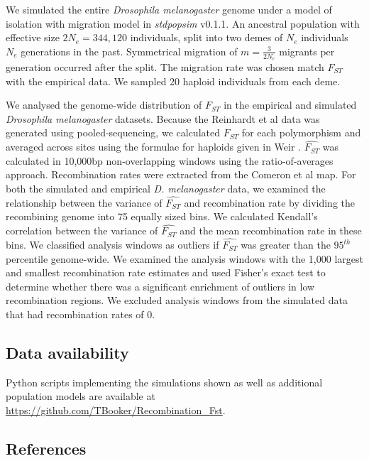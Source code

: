 \documentclass[9pt,twocolumn,twoside]{pnas-new}
\begin{document}
We simulated the entire \textit{Drosophila melanogaster} genome under a model of isolation with migration model in \textit{stdpopsim} v0.1.1. An ancestral population with effective size $2N_e = 344,120$ individuals, split into two demes of $N_e$ individuals $N_e$ generations in the past. Symmetrical migration of $m = \frac{3}{2N_e}$ migrants per generation occurred after the split. The migration rate was chosen match $F_{ST}$ with the empirical data. We sampled 20 haploid individuals from each deme.

We analysed the genome-wide distribution of $F_{ST}$ in the empirical and simulated \textit{Drosophila melanogaster} datasets. Because the Reinhardt et al \citep{Reinhardt2014-xq} data was generated using pooled-sequencing, we calculated $F_{ST}$ for each polymorphism and averaged across sites using the formulae for haploids given in Weir \cite{weir1990genetic}. $\hat{F_{ST}}$ was calculated in 10,000bp non-overlapping windows using the ratio-of-averages approach. Recombination rates were extracted from the Comeron et al \cite{Comeron2012} map. For both the simulated and empirical \textit{D. melanogaster} data, we examined the relationship between the variance of $\hat{F_{ST}}$ and recombination rate by dividing the recombining genome into 75 equally sized bins. We calculated Kendall's correlation between the variance of $\hat{F_{ST}}$ and the mean recombination rate in these bins. We classified analysis windows as outliers if $\hat{F_{ST}}$ was greater than the $95^{th}$ percentile genome-wide. We examined the analysis windows with the 1,000 largest and smallest recombination rate estimates and used Fisher's exact test to determine whether there was a significant enrichment of outliers in low recombination regions. We excluded analysis windows from the simulated data that had recombination rates of 0.

\subsection*{Data availability} Python scripts implementing the simulations shown as well as additional population models are available at \url{https://github.com/TBooker/Recombination_Fst}.


\showacknow{} %

\subsection*{References}

\end{document}

